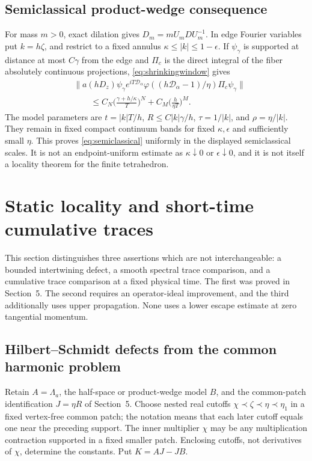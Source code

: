 \documentclass[11pt]{amsart}
\numberwithin{equation}{section}
\theoremstyle{remark}
\newcommand{\Dcal}{\mathcal{D}}
\begin{document}
\subsection{Semiclassical product-wedge consequence}
For mass $m>0$, exact dilation gives $D_m=mU_mDU_m^{-1}$. In edge Fourier variables put $k=h\zeta$, and restrict to a fixed annulus $\kappa\le|k|\le1-\epsilon$. If $\psi_\gamma$ is supported at distance at most $C\gamma$ from the edge and $\Pi_c$ is the direct integral of the fiber absolutely continuous projections, \eqref{eq:shrinkingwindow} gives
\begin{equation}\label{eq:semiclassical}
\begin{aligned}
&\big\|a(hD_z)\psi_\gamma e^{iT\Dcal_\alpha}\varphi((h\Dcal_\alpha-1)/\eta)\Pi_c\psi_\gamma\big\|\\
&\qquad\le C_N\Big(\frac{\gamma+h/\kappa}{T}\Big)^N+C_M\Big(\frac{h}{\eta T}\Big)^M .
\end{aligned}
\end{equation}
The model parameters are $t=|k|T/h$, $R\le C|k|\gamma/h$, $\tau=1/|k|$, and $\rho=\eta/|k|$. They remain in fixed compact continuum bands for fixed $\kappa,\epsilon$ and sufficiently small $\eta$. This proves \eqref{eq:semiclassical} uniformly in the displayed semiclassical scales. It is not an endpoint-uniform estimate as $\kappa\downarrow0$ or $\epsilon\downarrow0$, and it is not itself a locality theorem for the finite tetrahedron.

\section{Static locality and short-time cumulative traces}

This section distinguishes three assertions which are not interchangeable: a bounded intertwining defect, a smooth spectral trace comparison, and a cumulative trace comparison at a fixed physical time. The first was proved in Section~5. The second requires an operator-ideal improvement, and the third additionally uses upper propagation. None uses a lower escape estimate at zero tangential momentum.

\subsection{Hilbert--Schmidt defects from the common harmonic problem}
Retain $A=\Lambda_a$, the half-space or product-wedge model $B$, and the common-patch identification $J=\eta R$ of Section~5. Choose nested real cutoffs $\chi\prec\zeta\prec\eta\prec\eta_1$ in a fixed vertex-free common patch; the notation means that each later cutoff equals one near the preceding support. The inner multiplier $\chi$ may be any multiplication contraction supported in a fixed smaller patch. Enclosing cutoffs, not derivatives of $\chi$, determine the constants. Put $K=AJ-JB$.
\end{document}

